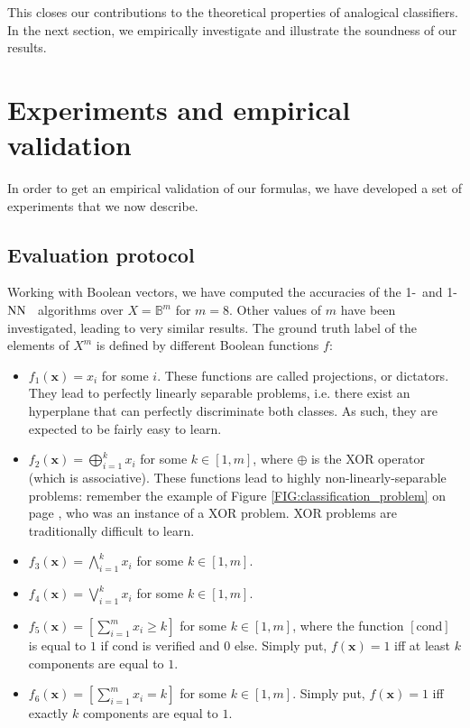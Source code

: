 This closes our contributions to the theoretical properties of analogical
classifiers. In the next section, we empirically investigate and illustrate the
soundness of our results.

\section{Experiments and empirical validation}
\label{SEC:experiments_and_empirical_validation}
In order to get an empirical validation of our formulas, we have developed a
set of experiments that we now describe.

\subsection{Evaluation protocol}

Working with Boolean vectors, we have computed the accuracies of the 1-\NAN~and
1-$\text{NN}$~ algorithms over $X=\mathbb{B}^m$ for $m = 8$. Other values of $m$ have
been investigated, leading to very similar results.  The ground truth label of
the elements of $X^m$ is defined by different Boolean functions $f$:
\begin{itemize}
\item $f_1(\mathbf{x})=x_i$ for some $i$. These functions are called
  projections, or dictators.  They lead to perfectly linearly
    separable problems, i.e.  there exist an hyperplane that can perfectly
    discriminate both classes. As such, they are expected to be fairly easy to
    learn.
  \item $f_2(\mathbf{x})= \bigoplus_{i = 1}^k  x_i$ for some $k \in[1, m]$, where $\oplus$
    is the XOR operator (which is associative). These functions
    lead to highly non-linearly-separable problems: remember the example of
    Figure \ref{FIG:classification_problem} on page
    \pageref{FIG:classification_problem}, who was an instance of a XOR problem.
    XOR problems are traditionally difficult to learn.
  \item $f_3(\mathbf{x})= \bigwedge_{i = 1}^k  x_i$ for some $k \in [1, m]$.
  \item $f_4(\mathbf{x})= \bigvee_{i = 1}^k  x_i$ for some $k\in [1, m]$.
  \item $f_5(\mathbf{x}) = \left[\sum_{i = 1}^m x_i \geq k\right]$ for some $k
    \in [1, m]$, where the function $[\text{cond}]$ is equal to $1$ if cond is
    verified and $0$ else. Simply put, $f(\mathbf{x}) = 1$ iff at least $k$
    components are equal to $1$.
  \item $f_6(\mathbf{x}) = \left[\sum_{i = 1}^m x_i = k\right]$ for some $k
    \in [1, m]$. Simply put, $f(\mathbf{x}) = 1$ iff exactly $k$ components
    are equal to $1$.
\end{itemize}


